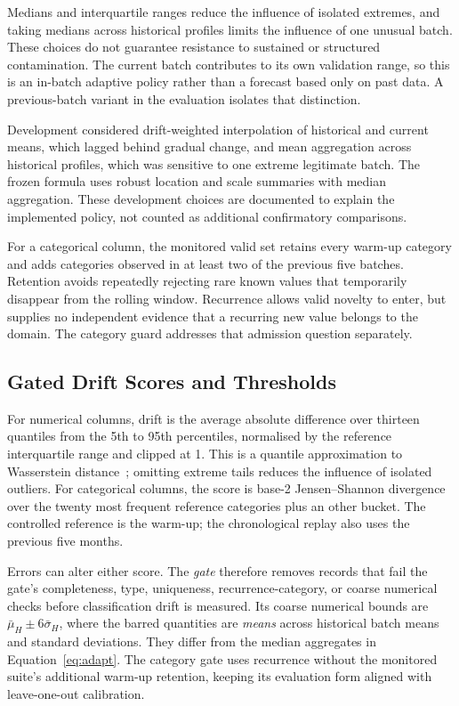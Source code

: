 Medians and interquartile ranges reduce the influence of isolated extremes, and taking medians across historical profiles limits the influence of one unusual batch. These choices do not guarantee resistance to sustained or structured contamination. The current batch contributes to its own validation range, so this is an in-batch adaptive policy rather than a forecast based only on past data. A previous-batch variant in the evaluation isolates that distinction.

Development considered drift-weighted interpolation of historical and current means, which lagged behind gradual change, and mean aggregation across historical profiles, which was sensitive to one extreme legitimate batch. The frozen formula uses robust location and scale summaries with median aggregation. These development choices are documented to explain the implemented policy, not counted as additional confirmatory comparisons.

For a categorical column, the monitored valid set retains every warm-up category and adds categories observed in at least two of the previous five batches. Retention avoids repeatedly rejecting rare known values that temporarily disappear from the rolling window. Recurrence allows valid novelty to enter, but supplies no independent evidence that a recurring new value belongs to the domain. The category guard addresses that admission question separately.

\subsection{Gated Drift Scores and Thresholds}
\label{sec:method:drift}

For numerical columns, drift is the average absolute difference over thirteen quantiles from the 5th to 95th percentiles, normalised by the reference interquartile range and clipped at 1. This is a quantile approximation to Wasserstein distance~\cite{Ramdas2017}; omitting extreme tails reduces the influence of isolated outliers. For categorical columns, the score is base-2 Jensen--Shannon divergence~\cite{Lin1991} over the twenty most frequent reference categories plus an other bucket. The controlled reference is the warm-up; the chronological replay also uses the previous five months.

Errors can alter either score. The \emph{gate} therefore removes records that fail the gate's completeness, type, uniqueness, recurrence-category, or coarse numerical checks before classification drift is measured. Its coarse numerical bounds are $\bar{\mu}_H\pm6\bar{\sigma}_H$, where the barred quantities are \emph{means} across historical batch means and standard deviations. They differ from the median aggregates in Equation~\eqref{eq:adapt}. The category gate uses recurrence without the monitored suite's additional warm-up retention, keeping its evaluation form aligned with leave-one-out calibration.

